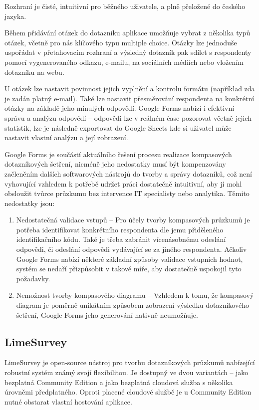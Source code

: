 Rozhraní je čisté, intuitivní pro běžného uživatele, a plně přeložené do českého jazyka.

Během přidávání otázek do dotazníku aplikace umožňuje vybrat z několika typů otázek, včetně pro nás klíčového 
typu multiple choice. Otázky lze jednoduše uspořádat v přetahovacím rozhraní a výsledný dotazník pak sdílet s 
respondenty pomocí vygenerovaného odkazu, e-mailu, na sociálních médiích nebo vložením dotazníku na webu.

U otázek lze nastavit povinnost jejich vyplnění a kontrolu formátu (například zda je zadán platný e-mail). 
Také lze nastavit přesměrování respondenta na konkrétní otázky na základě jeho minulých odpovědí. 
Google Forms nabízí i efektivní správu a analýzu odpovědí – odpovědi lze v reálném čase pozorovat včetně 
jejich statistik, lze je následně exportovat do Google Sheets kde si uživatel může nastavit vlastní analýzu a 
její zobrazení.~\cite{googleforms}

Google Forms je součástí aktuálního řešení procesu realizace kompasových dotazníkových šetření, nicméně jeho 
nedostatky musí být kompenzovány začleněním dalších softwarových nástrojů do tvorby a správy dotazníků, 
což není vyhovující vzhledem k potřebě udržet práci dostatečně intuitivní, aby jí mohl obsloužit tvůrce průzkumu 
bez intervence IT specialisty nebo analytika. Těmito nedostatky jsou:

\begin{enumerate}
    \item Nedostatečná validace vstupů – Pro účely tvorby kompasových průzkumů je potřeba identifikovat 
    konkrétního respondenta dle jemu přiděleného identifikačního kódu. Také je třeba zabránit vícenásobnému 
    odeslání odpovědi, či odeslání odpovědi vydávající se za jiného respondenta. Ačkoliv Google Forms nabízí 
    některé základní způsoby validace vstupních hodnot, systém se nedaří přizpůsobit v takové míře, aby dostatečně 
    uspokojil tyto požadavky.
    \item Nemožnost tvorby kompasového diagramu – Vzhledem k tomu, že kompasový diagram je poměrně unikátním 
    způsobem zobrazení výsledku dotazníkového šetření, Google Forms jeho generování nativně neumožňuje. 
\end{enumerate}

\subsection{LimeSurvey}
LimeSurvey je open-source nástroj pro tvorbu dotazníkových průzkumů nabízející robustní systém známý 
svojí flexibilitou. Je dostupný ve dvou variantách – jako bezplatná Community Edition a jako bezplatná 
cloudová služba s několika úrovněmi předplatného. Oproti placené cloudové službě je u Community Edition 
nutné obstarat vlastní hostování aplikace.

